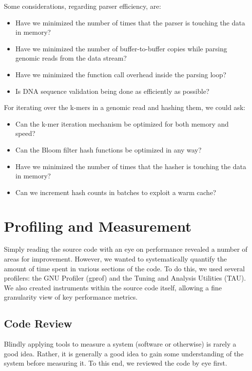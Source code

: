 Some considerations, regarding parser efficiency, are:
\begin{itemize}
\item Have we minimized the number of times that the parser is touching the 
data in memory?
\item Have we minimized the number of buffer-to-buffer copies while parsing 
genomic reads from the data stream?
\item Have we minimized the function call overhead inside the parsing loop?
\item Is DNA sequence validation being done as efficiently as possible?
\end{itemize}

For iterating over the k-mers in a genomic read and hashing them, we could ask:
\begin{itemize}
\item Can the k-mer iteration mechanism be optimized for both memory and speed?
\item Can the Bloom filter hash functions be optimized in any way?
\item Have we minimized the number of times that the hasher is touching the 
data in memory?
\item Can we increment hash counts in batches to exploit a warm cache?
\end{itemize}

\section{Profiling and Measurement}

Simply reading the source code with an eye on performance revealed a number of
areas for improvement. However, we wanted to systematically quantify the amount
of time spent in various sections of the code. To do this, we used several
profilers: the GNU Profiler (gprof) and the Tuning and Analysis Utilities
(TAU). We also created instruments within the source code itself, allowing a
fine granularity view of key performance metrics.

\subsection{Code Review}

Blindly applying tools to measure a system (software or otherwise) is rarely a
good idea. Rather, it is generally a good idea to gain some understanding of
the system before measuring it. To this end, we reviewed the code by eye first.

